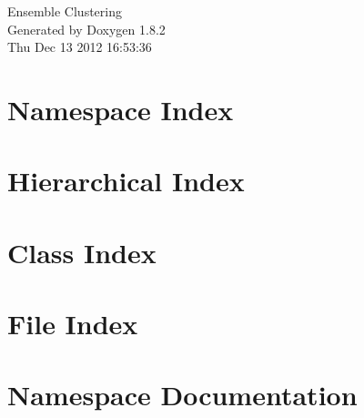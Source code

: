 \documentclass{book}
\begin{document}
\hypersetup{pageanchor=false,citecolor=blue}
\begin{titlepage}
\vspace*{7cm}
\begin{center}
{\Large Ensemble Clustering }\\
\vspace*{1cm}
{\large Generated by Doxygen 1.8.2}\\
\vspace*{0.5cm}
{\small Thu Dec 13 2012 16:53:36}\\
\end{center}
\end{titlepage}
\clearemptydoublepage
{}
\tableofcontents
\clearemptydoublepage
{}
\hypersetup{pageanchor=true,citecolor=blue}
\chapter{Namespace Index}

\chapter{Hierarchical Index}

\chapter{Class Index}

\chapter{File Index}

\chapter{Namespace Documentation}

\end{document}
